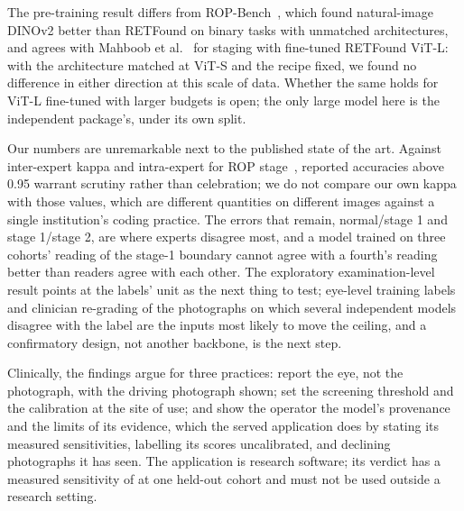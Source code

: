 \documentclass[journal]{IEEEtran}
\begin{document}
The pre-training result differs from ROP-Bench~\cite{luo2026}, which found natural-image DINOv2 better than RETFound on binary tasks with unmatched architectures, and agrees with Mahboob et al.~\cite{mahboob2025} for staging with fine-tuned RETFound ViT-L: with the architecture matched at ViT-S and the recipe fixed, we found no difference in either direction at this scale of data. Whether the same holds for ViT-L fine-tuned with larger budgets is open; the only large model here is the independent package's, under its own split.

Our numbers are unremarkable next to the published state of the art. Against inter-expert kappa \humanInterKappa{} and intra-expert \humanIntraKappa{} for ROP stage~\cite{gschliesser2015}, reported accuracies above 0.95 warrant scrutiny rather than celebration; we do not compare our own kappa with those values, which are different quantities on different images against a single institution's coding practice. The errors that remain, normal/stage 1 and stage 1/stage 2, are where experts disagree most, and a model trained on three cohorts' reading of the stage-1 boundary cannot agree with a fourth's reading better than readers agree with each other. The exploratory examination-level result points at the labels' unit as the next thing to test; eye-level training labels and clinician re-grading of the photographs on which several independent models disagree with the label are the inputs most likely to move the ceiling, and a confirmatory design, not another backbone, is the next step.

Clinically, the findings argue for three practices: report the eye, not the photograph, with the driving photograph shown; set the screening threshold and the calibration at the site of use; and show the operator the model's provenance and the limits of its evidence, which the served application does by stating its measured sensitivities, labelling its scores uncalibrated, and declining photographs it has seen. The application is research software; its verdict has a measured sensitivity of \BdevSensEns{} at one held-out cohort and must not be used outside a research setting.
\end{document}
